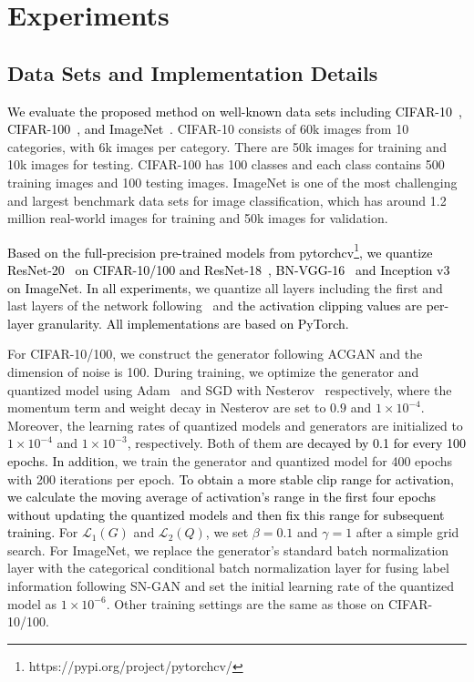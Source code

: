 \documentclass[runningheads]{llncs}
\def\mL{{\mathcal L}}
\def\lhk{\textcolor{black}}
\def\xsk{\textcolor{black}}
\def\jing{\textcolor{black}}
\def\new{\textcolor{black}}
\begin{document}
\section{Experiments}
\setcounter{footnote}{0}

\subsection{Data Sets and Implementation Details}
\jing{
We evaluate the proposed method on well-known data sets including CIFAR-10~\cite{krizhevsky2009learning}, CIFAR-100~\cite{krizhevsky2009learning}, and ImageNet~\cite{deng2009imagenet}.} CIFAR-10 consists of 60k images from 10 categories, with 6k images per category. There are 50k images for training and 10k images for testing. CIFAR-100 has 100 classes and each class contains 500 training images and 100 testing images. ImageNet is one of the most challenging and largest benchmark data sets for image classification, which has around 1.2 million real-world images for training and 50k images for validation. 

\jing{
Based on the full-precision pre-trained models from pytorchcv\footnote{https://pypi.org/project/pytorchcv/}, we quantize ResNet-20~\cite{he2016deep} on CIFAR-10/100 and ResNet-18~\cite{he2016deep}, BN-VGG-16~\cite{SimonyanZ14a} and Inception v3~\cite{szegedy2016rethinking} on ImageNet.} \new{In all experiments,} we quantize all layers including the first and last layers of the network following~\cite{Cai_2020_CVPR} and \new{the activation clipping values are per-layer granularity.} \lhk{All implementations are based on PyTorch.}

For CIFAR-10/100, we construct the generator following ACGAN \cite{odena2017conditional} and the dimension of noise is 100. 
During training, we optimize the generator and quantized model using  Adam~\cite{KingmaB14} and SGD with Nesterov~\cite{nesterov1983method} respectively, where the momentum term and weight decay in Nesterov are set to $0.9$ and $1 \times 10^{-4}$.
Moreover, the learning rates of quantized models and generators are initialized to $1 \times 10^{-4}$ and $1 \times 10^{-3}$, respectively. 
Both of them \xsk{are decayed by 0.1 for every 100 epochs.}
\new{In addition}, we train the generator and quantized model for 400 epochs with 200 iterations per epoch. 
\lhk{To obtain a more stable clip range for activation, we calculate the moving average of activation's range in the first four epochs without updating the quantized models and then fix this range for subsequent training.}
For $\mL_{1}(G)$ and $\mL_{2}(Q)$, we set $\beta=0.1$ and $\gamma=1$ after a simple grid search.
For ImageNet, we replace the generator's standard batch normalization layer with the categorical conditional batch normalization layer for fusing label information following SN-GAN \cite{miyato2018spectral} and set the initial learning rate of the quantized model as $1 \times 10^{-6}$. Other training settings are the same as those on CIFAR-10/100. 
\end{document}
